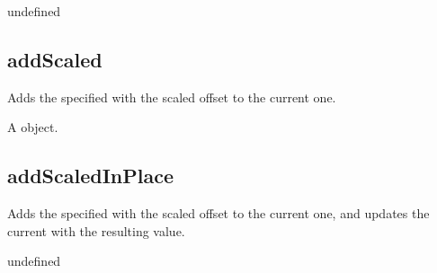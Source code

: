 \documentclass[letterpaper,12pt,english,openany,oneside]{sphinxmanual}
\begin{document}
\label{\detokenize{JS_3D_API:section-130}}\label{\detokenize{JS_3D_API:returns-131}}

undefined


\subsection{addScaled}
\label{\detokenize{JS_3D_API:addscaled}}
Adds the specified  with the scaled offset to the current one.

\label{\detokenize{JS_3D_API:syntax-131}}

\begin{sphinxVerbatim}[commandchars=\\\{\}]
 
\end{sphinxVerbatim}
\label{\detokenize{JS_3D_API:parameters-93}}

\label{\detokenize{JS_3D_API:section-131}}\label{\detokenize{JS_3D_API:returns-132}}

A  object.


\subsection{addScaledInPlace}
\label{\detokenize{JS_3D_API:addscaledinplace}}
Adds the specified  with the scaled offset to the current one, and updates the current  with the resulting value.

\label{\detokenize{JS_3D_API:syntax-132}}

\begin{sphinxVerbatim}[commandchars=\\\{\}]
 
\end{sphinxVerbatim}
\label{\detokenize{JS_3D_API:parameters-94}}

\label{\detokenize{JS_3D_API:section-132}}\label{\detokenize{JS_3D_API:returns-133}}

undefined
\end{document}
